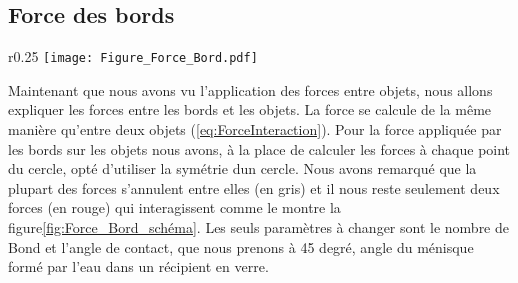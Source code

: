 
    \newpage
    \subsection{Force des bords}
        \begin{wrapfigure}{r}{0.25\textwidth}
        \centering
            \texttt{[image: Figure\_Force\_Bord.pdf]}
            \caption{Schéma des forces des bords.}
            \label{fig:Force_Bord_schéma}
        \end{wrapfigure}
        Maintenant que nous avons vu l'application des forces entre objets, nous allons expliquer les forces entre les bords et les objets. La force se calcule de la même manière qu'entre deux objets (\ref{eq:ForceInteraction}). Pour la force appliquée par les bords sur les objets nous avons, à la place de calculer les forces à chaque point du cercle, opté d'utiliser la symétrie dun cercle. Nous avons remarqué que la plupart des forces s'annulent entre elles (en gris) et il nous reste seulement deux forces (en rouge) qui interagissent comme le montre la figure\ref{fig:Force_Bord_schéma}. Les seuls paramètres à changer sont le nombre de Bond et l'angle de contact, que nous prenons à 45 degré, angle du ménisque formé par l'eau dans un récipient en verre. 
